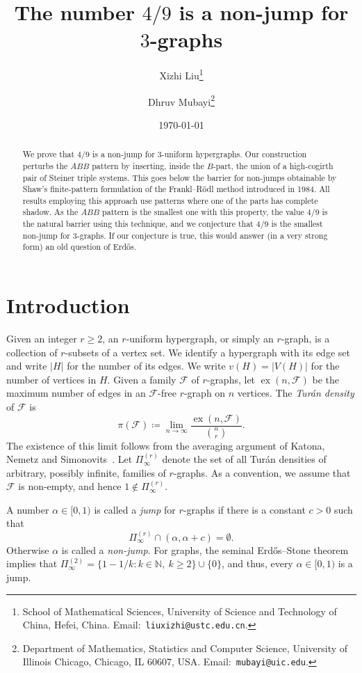 \documentclass[10pt]{article}
\title{\Large\bf The number $4/9$ is a non-jump for $3$-graphs}
\author{%
Xizhi Liu\thanks{School of Mathematical Sciences, University of Science and Technology of China, Hefei, China. Email:~\texttt{liuxizhi@ustc.edu.cn}.}
\and
Dhruv Mubayi\thanks{Department of Mathematics, Statistics and Computer Science, University of Illinois Chicago, Chicago, IL 60607, USA. Email:~\texttt{mubayi@uic.edu}.}}
\date{\today}
\numberwithin{equation}{section}
\theoremstyle{definition}
\theoremstyle{remark}
\newcommand{\ex}{\operatorname{ex}}
\begin{document}
\maketitle

\begin{abstract}
    We prove that $4/9$ is a non-jump for $3$-uniform hypergraphs. Our construction perturbs the $ABB$ pattern by inserting, inside the $B$-part, the union of a high-cogirth pair of Steiner triple systems.  This goes below the barrier for non-jumps obtainable by Shaw's finite-pattern formulation of the Frankl--R\"odl method introduced in 1984. All results employing this approach use patterns where one of the parts has complete shadow. As the $ABB$ pattern is the smallest one with this property, the value $4/9$ is the natural barrier using this technique, and we conjecture that $4/9$ is the smallest non-jump for $3$-graphs. If our conjecture is true, this would answer (in a very strong form) an old question of Erd\H os.    
\end{abstract}

\section{Introduction}\label{SEC:Introduction}

Given an integer $r\ge 2$, an $r$-uniform hypergraph, or simply an $r$-graph, is a collection of $r$-subsets of a vertex set.  We identify a hypergraph with its edge set and write $|H|$ for the number of its edges. We write $v(H)=|V(H)|$ for the number of vertices in $H$. Given a family $\mathcal F$ of $r$-graphs, let $\ex(n,\mathcal F)$ be the maximum number of edges in an $\mathcal F$-free $r$-graph on $n$ vertices. The \emph{Tur\'an density} of $\mathcal F$ is
\[
        \pi(\mathcal F)
        \coloneqq
        \lim_{n\to\infty}\frac{\ex(n,\mathcal F)}{\binom nr}.
\]
The existence of this limit follows from the averaging argument of Katona, Nemetz and Simonovits~\cite{KatonaNemetzSimonovits64}.  Let $\Pi^{(r)}_\infty$ denote the set of all Tur\'an densities of arbitrary, possibly infinite, families of $r$-graphs. As a convention, we assume that $\mathcal F$ is non-empty, and hence $1\notin \Pi^{(r)}_\infty$.

A number $\alpha\in[0,1)$ is called a \emph{jump} for $r$-graphs if there is a constant $c>0$ such that
\[
        \Pi^{(r)}_\infty\cap(\alpha,\alpha+c)=\emptyset.
\]
Otherwise $\alpha$ is called a \emph{non-jump}.  For graphs, the seminal Erd\H{o}s--Stone theorem~\cite{ErdosStone46} implies that $\Pi^{(2)}_\infty = \{1-1/k \colon k \in \mathbb{N},\ k \ge 2\} \cup \{0\}$, and thus, every $\alpha\in[0,1)$ is a jump.
\end{document}
